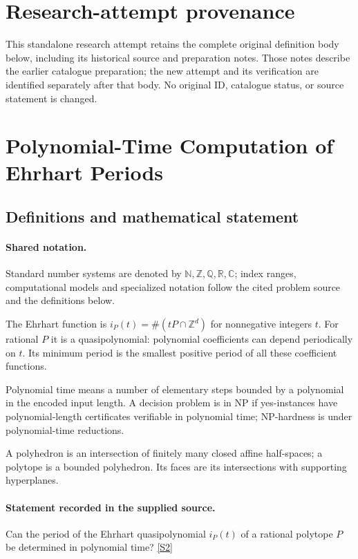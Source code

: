 \documentclass[11pt]{article}
\begin{document}
\section*{Research-attempt provenance}
This standalone research attempt retains the complete original definition body below,
including its historical source and preparation notes. Those notes describe the
earlier catalogue preparation; the new attempt and its verification are identified
separately after that body. No original ID, catalogue status, or source statement is changed.

\section{Polynomial-Time Computation of Ehrhart Periods}\label{statement}

\subsection{Definitions and mathematical statement}

\paragraph{Shared notation.}Standard number systems are denoted by $\mathbb N,\mathbb Z,\mathbb Q,\mathbb R,\mathbb C$; index ranges, computational models and specialized notation follow the cited problem source and the definitions below.


The Ehrhart function is $i_P(t)=\#(tP\cap\mathbb Z^d)$ for nonnegative integers $t$. For rational $P$ it is a quasipolynomial: polynomial coefficients can depend periodically on $t$. Its minimum period is the smallest positive period of all these coefficient functions.

Polynomial time means a number of elementary steps bounded by a polynomial in the encoded input length. A decision problem is in $\mathrm{NP}$ if yes-instances have polynomial-length certificates verifiable in polynomial time; NP-hardness is under polynomial-time reductions.

A polyhedron is an intersection of finitely many closed affine half-spaces; a polytope is a bounded polyhedron. Its faces are its intersections with supporting hyperplanes.
\paragraph{Statement recorded in the supplied source.}
Can the period of the Ehrhart quasipolynomial $i_P(t)$ of a rational polytope $P$ be determined in polynomial time? \href{https://doi.org/10.4171/owr/2004/39}{[S2]}
\end{document}
